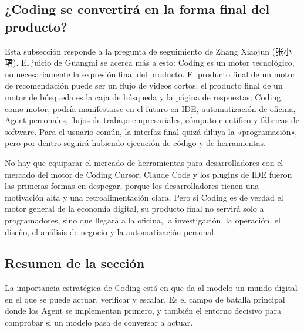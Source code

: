\subsection{¿Coding se convertirá en la forma final del producto?}

Esta subsección responde a la pregunta de seguimiento de Zhang Xiaojun (张小珺). El juicio de Guangmi se acerca más a esto: Coding es un motor tecnológico, no necesariamente la expresión final del producto. El producto final de un motor de recomendación puede ser un flujo de videos cortos; el producto final de un motor de búsqueda es la caja de búsqueda y la página de respuestas; Coding, como motor, podría manifestarse en el futuro en IDE, automatización de oficina, Agent personales, flujos de trabajo empresariales, cómputo científico y fábricas de software. Para el usuario común, la interfaz final quizá diluya la «programación», pero por dentro seguirá habiendo ejecución de código y de herramientas.

\begin{warningbox}{No hay que equiparar el mercado de herramientas para desarrolladores con el mercado del motor de Coding}
Cursor, Claude Code y los plugins de IDE fueron las primeras formas en despegar, porque los desarrolladores tienen una motivación alta y una retroalimentación clara. Pero si Coding es de verdad el motor general de la economía digital, su producto final no servirá solo a programadores, sino que llegará a la oficina, la investigación, la operación, el diseño, el análisis de negocio y la automatización personal.
\end{warningbox}

\subsection{Resumen de la sección}

La importancia estratégica de Coding está en que da al modelo un mundo digital en el que se puede actuar, verificar y escalar. Es el campo de batalla principal donde los Agent se implementan primero, y también el entorno decisivo para comprobar si un modelo pasa de conversar a actuar.
